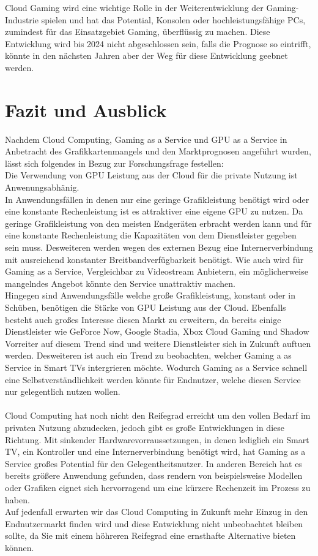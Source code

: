 \documentclass[12pt,toc=bib,toc=listof]{scrreprt}
\begin{document}
Cloud Gaming wird eine wichtige Rolle in der Weiterentwicklung der Gaming-Industrie spielen und hat das Potential, 
Konsolen oder hochleistungsfähige PCs, zumindest für das Einsatzgebiet Gaming, überflüssig zu machen. Diese Entwicklung 
wird bis 2024 nicht abgeschlossen sein, falls die Prognose so eintrifft, könnte in den nächsten Jahren aber der Weg 
für diese Entwicklung geebnet werden.

\chapter{Fazit und Ausblick} %
\label{sec:fazit}
Nachdem Cloud Computing, Gaming as a Service und GPU as a Service in Anbetracht des Grafikkartenmangels und 
den Marktprognosen angeführt wurden, lässt sich folgendes in Bezug zur Forschungsfrage festellen:\\
Die Verwendung von GPU Leistung aus der Cloud für die private Nutzung ist Anwenungsabhänig.\\
In Anwendungsfällen in denen nur eine geringe Grafikleistung benötigt wird oder eine konstante Rechenleistung ist 
es attraktiver eine eigene GPU zu nutzen. Da geringe Grafikleistung von den meisten Endgeräten erbracht werden kann und 
für eine konstante Rechenleistung die Kapazitäten von dem Dienstleister gegeben sein muss. Desweiteren werden wegen des 
externen Bezug eine Internerverbindung mit ausreichend konstanter Breitbandverfügbarkeit benötigt. 
Wie auch wird für Gaming as a Service, Vergleichbar zu Videostream Anbietern, ein möglicherweise 
mangelndes Angebot könnte den Service unattraktiv machen.\\
Hingegen sind Anwendungsfälle welche große Grafikleistung, konstant oder in Schüben, benötigen die Stärke von GPU Leistung aus der Cloud.
Ebenfalls besteht auch großes Interesse diesen Markt zu erweitern, da bereits 
einige Dienstleister wie GeForce Now, Google Stadia, Xbox Cloud Gaming und Shadow Vorreiter auf diesem Trend sind und 
weitere Dienstleister sich in Zukunft auftuen werden.
Desweiteren ist auch ein Trend zu beobachten, welcher Gaming a as Service in Smart TVs intergrieren möchte. Wodurch 
Gaming as a Service schnell eine Selbstverständlichkeit werden könnte für Endnutzer, welche diesen Service nur gelegentlich nutzen wollen.\\
\\Cloud Computing hat noch nicht den Reifegrad erreicht um den vollen Bedarf im privaten Nutzung abzudecken, jedoch gibt es 
große Entwicklungen in diese Richtung. Mit sinkender Hardwarevorraussetzungen, 
in denen lediglich ein Smart TV, ein Kontroller und eine Internerverbindung benötigt wird, hat Gaming as a Service großes Potential für den Gelegentheitsnutzer.
In anderen Bereich hat es bereits größere Anwendung gefunden, dass rendern von beispielsweise Modellen oder Grafiken eignet sich hervorragend um eine kürzere Rechenzeit im Prozess zu haben.
\\Auf jedenfall erwarten wir das Cloud Computing in Zukunft mehr Einzug in den Endnutzermarkt finden wird und diese Entwicklung nicht unbeobachtet bleiben sollte, da Sie mit einem höhreren Reifegrad eine ernsthafte Alternative bieten können.
\end{document}
